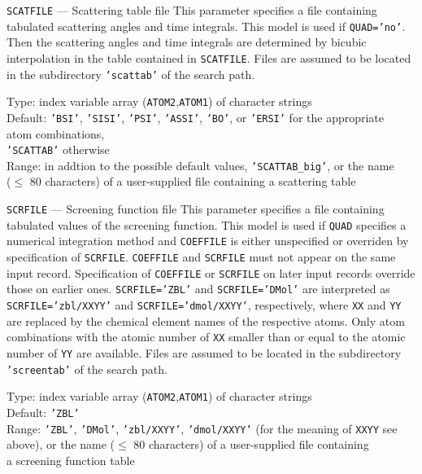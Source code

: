 \begin{keydescription}{\texttt{SCATFILE} --- Scattering table file}
%
  This parameter specifies a file containing tabulated scattering angles
  and time integrals. This model is used if 
  \texttt{QUAD='no'}. Then the scattering angles and time integrals are determined 
  by bicubic interpolation in the table contained in \texttt{SCATFILE}. Files 
  are assumed to be located in the subdirectory \texttt{'scattab'} of the 
  search path.
  \begin{keytab}
    Type:    \> index variable array (\texttt{ATOM2},\texttt{ATOM1}) 
                of character strings \\ 
    Default: \> \texttt{'BSI'}, \texttt{'SISI'}, \texttt{'PSI'}, 
                \texttt{'ASSI'}, \texttt{'BO'}, or \texttt{'ERSI'} for the 
                appropriate \\
             \> atom combinations, \\
             \> \texttt{'SCATTAB'} otherwise \\
    Range:   \> in addtion to the possible default values, 
                \texttt{'SCATTAB\_big'}, or the name \\
             \> ($\le$ 80 characters) of a user-supplied file containing a scattering table 
  \end{keytab}
\end{keydescription}

\begin{keydescription}{\texttt{SCRFILE} --- Screening function file}
%
  This parameter specifies a file containing tabulated values of the
  screening function. This model is used if \texttt{QUAD} specifies a 
  numerical integration method and 
  \texttt{COEFFILE} is either unspecified or overriden by specification of
  \texttt{SCRFILE}. \texttt{COEFFILE} and \texttt{SCRFILE} must not 
  appear on the same input record. Specification of \texttt{COEFFILE} or 
  \texttt{SCRFILE} on later input records override those on earlier ones. 
  \texttt{SCRFILE='ZBL'} and \texttt{SCRFILE='DMol'} are interpreted as 
  \texttt{SCRFILE='zbl/XXYY'} and \texttt{SCRFILE='dmol/XXYY'},
  respectively, where \texttt{XX} and \texttt{YY} are replaced by the chemical 
  element names of the respective atoms. Only atom combinations with the 
  atomic number of \texttt{XX} smaller than or equal to the atomic number of 
  \texttt{YY} are available. Files are assumed to be located in the subdirectory 
  \texttt{'screentab'} of the search path.
  \begin{keytab}
    Type:    \> index variable array (\texttt{ATOM2},\texttt{ATOM1}) 
                of character strings \\ 
    Default: \> \texttt{'ZBL'} \\
    Range:   \> \texttt{'ZBL'}, \texttt{'DMol'}, 
                \texttt{'zbl/XXYY'}, \texttt{'dmol/XXYY'} 
                (for the meaning of \texttt{XXYY} see \\
             \> above), or the name ($\le$ 80 characters) of a user-supplied
                file containing  \\
             \> a screening function table 
  \end{keytab}
\end{keydescription}


